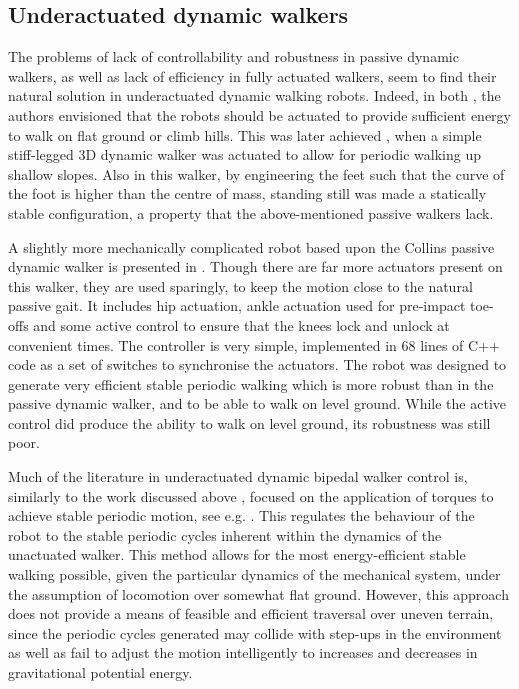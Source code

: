 \subsection{Underactuated dynamic walkers}
The problems of lack of controllability and robustness in passive dynamic walkers, as well as lack of efficiency in fully actuated walkers, seem to find their natural solution in underactuated dynamic walking robots. Indeed, in both \cite{mcgeer1990passive, collins2001three}, the authors envisioned that the robots should be actuated to provide sufficient energy to walk on flat ground or climb hills. This was later  achieved \cite{tedrake2004actuating}, when a simple stiff-legged 3D dynamic walker was actuated to allow for periodic walking up shallow slopes. Also in this walker, by engineering the feet such that the curve of the foot is higher than the centre of mass, standing still was made a statically stable configuration, a property that the above-mentioned passive walkers lack.

A slightly more mechanically complicated robot based upon the Collins passive dynamic walker is presented in \cite{collins2005bipedal}. Though there are far more actuators present on this walker, they are used sparingly, to keep the motion close to the natural passive gait. It includes hip actuation, ankle actuation used for pre-impact toe-offs and some active control to ensure that the knees lock and unlock at convenient times. The controller is very simple, implemented in 68 lines of C++ code as a set of switches to synchronise the actuators. The robot was designed to generate very efficient stable periodic walking which is more robust than in the passive dynamic walker, and to be able to walk on level ground. While the active control did produce the ability to walk on level ground, its robustness was still poor.

Much of the literature in underactuated dynamic bipedal walker control is, similarly to the work discussed above \cite{tedrake2004actuating, collins2005bipedal}, focused on the application of torques to achieve stable periodic motion, see e.g. \cite{grizzle2001asymptotically, shiriaev2005constructive, sreenath2011compliant}. This regulates the behaviour of the robot to the stable periodic cycles inherent within the dynamics of the unactuated walker. This method allows for the most energy-efficient stable walking possible, given the particular dynamics of the mechanical system, under the assumption of locomotion over somewhat flat ground. However, this approach does not provide a means of feasible and efficient traversal over uneven terrain, since the periodic cycles generated may collide with step-ups in the environment as well as fail to adjust the motion intelligently to increases and decreases in gravitational potential energy.

